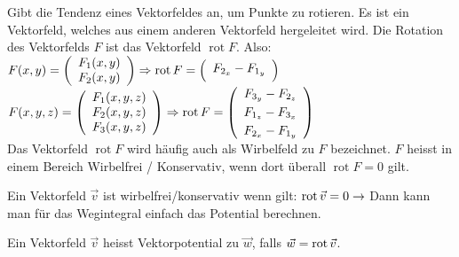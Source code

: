 \begin{definition}
Gibt die Tendenz eines Vektorfeldes an, um Punkte zu rotieren. Es ist ein Vektorfeld, welches aus einem anderen Vektorfeld hergeleitet wird. Die Rotation des Vektorfelds $F$ ist das Vektorfeld $\operatorname{rot} F$. Also: 
$F (x, y) = 
\left(
	\begin{array}{c}
		F_1 (x, y) \\
		F_2 (x, y)
	\end{array}
\right) \Rightarrow
 \operatorname{rot} F = 
\left(
	\begin{array}{c}
		\vspace{3pt} F_{2_x} - F_{1_y}
	\end{array}
\right)$\\
$F(x, y, z) = 
\left(
	\begin{array}{c}
		F_1 (x, y, z) \\
		F_2 (x, y, z) \\
		F_3 (x, y, z)
	\end{array}
\right) \Rightarrow
 \operatorname{rot} F = 
\left(
	\begin{array}{c}
		\vspace{3pt} F_{3_y} - F_{2_z} \\
		\vspace{3pt} F_{1_z} - F_{3_x} \\
					 F_{2_x} - F_{1_y}
	\end{array}
\right)$\\
Das Vektorfeld $\operatorname{rot} F$ wird häufig auch als Wirbelfeld zu $F$ bezeichnet. $F$ heisst in einem Bereich Wirbelfrei / Konservativ, wenn dort überall $\operatorname{rot} F = 0$ gilt.
\end{definition}

\begin{definition}
Ein Vektorfeld $\vec{v}$ ist wirbelfrei/konservativ wenn gilt: $\operatorname{rot} \vec{v} = 0 \rightarrow$ Dann kann man für das Wegintegral einfach das Potential berechnen.
\end{definition}

\begin{definition}[Vektorpotential]
Ein Vektorfeld $\vec{v}$ heisst Vektorpotential zu $\vec{w}$, falls $\vec{w} = \operatorname{rot} \vec{v}$.
\end{definition}

